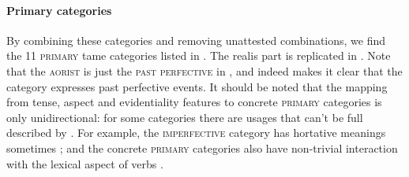 \documentclass[a4paper, oneside, 12pt]{report}
\newcommand*{\citesec}[1]{\S~{#1}}
\newcommand*{\citetable}[1]{Table~{#1}}
\newcommand*{\citepage}[1]{p.~{#1}}
\newcommand{\category}[1]{\textsc{#1}}
\begin{document}
\paragraph*{Primary categories}

By combining these categories and removing unattested combinations, 
we find the 11 \category{primary} \acs{tame} categories 
listed in \citet[\citepage{21.1}]{jacques2021grammar}.
The realis part is replicated in .
Note that the \category{aorist} is just the \category{past perfective} in
\citet[\citetable{31.4}]{jacques2015sketch}, 
and indeed \citet[\citepage{1135}]{jacques2021grammar}
makes it clear that the category expresses past perfective events.
It should be noted that the mapping from tense, aspect and evidentiality features 
to concrete \category{primary} categories 
is only unidirectional:
for some categories there are usages that can't be full described by .
For example, the \category{imperfective} category 
has hortative meanings sometimes \citep[\citesec{21.2.5}]{jacques2021grammar}; 
and the concrete \category{primary} categories also have non-trivial interaction with the lexical aspect of verbs 
\citep[\citesec{21.2.6}, \citesec{21.2.7}]{jacques2021grammar}.
 
\end{document}
